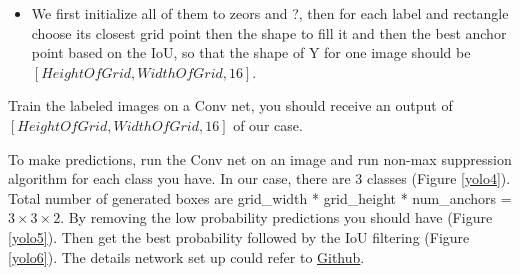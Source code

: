 \begin{itemize}
    \item We first initialize all of them to zeors and ?, then for each label and rectangle choose its closest grid point then the shape to fill it and then the best anchor point based on the IoU, so that the shape of Y for one image should be $[HeightOfGrid, WidthOfGrid,16]$.
\end{itemize}

Train the labeled images on a Conv net, you should receive an output of $[HeightOfGrid, WidthOfGrid,16]$ of our case.

To make predictions, run the Conv net on an image and run non-max suppression algorithm for each class you have. In our case, there are 3 classes (Figure \ref{yolo4}). Total number of generated boxes are grid\_width * grid\_height * num\_anchors = $3\times 3 \times 2$. By removing the low probability predictions you should have (Figure \ref{yolo5}). Then get the best probability followed by the IoU filtering (Figure \ref{yolo6}). The details network set up could refer to \href{https://github.com/mbadry1/DeepLearning.ai-Summary/tree/master/4-\%20Convolutional\%20Neural\%20Networks#yolo-algorithm}{Github}.

